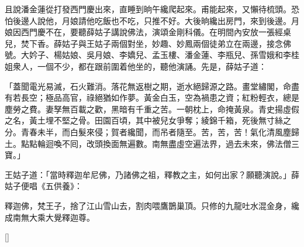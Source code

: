 且說潘金蓮從打發西門慶出來，直睡到晌午纔爬起來。甫能起來，又懶待梳頭。恐怕後邊人說他，月娘請他吃飯也不吃，只推不好。大後晌纔出房門，{}來到後邊。月娘因西門慶不在，要聽薛姑子講說佛法，演頌金剛科儀。在明間內安放一張經桌兒，焚下香。薛姑子與王姑子兩個對坐，妙趣、妙鳳兩個徒弟立在兩邊，接念佛號。大妗子、楊姑娘、吳月娘、李嬌兒、孟玉樓、潘金蓮、李瓶兒、孫雪娥和李桂姐衆人，一個不少，都在跟前圍着他坐的，聽他演誦。先是，薛姑子道：

\begin{myquote}[\markfont]
「蓋聞電光易滅，石火難消。落花無返樹之期，逝水絕歸源之路。畫堂繡閣，命盡有若長空；極品高官，祿絕猶如作夢。黃金白玉，空為禍患之資；紅粉輕衣，總是塵勞之費。妻孥無百載之歡，黑暗有千重之苦。一朝枕上，命掩黃泉。青史揚虛假之名，黃土埋不堅之骨。田園百頃，其中被兒女爭奪；綾錦千箱，死後無寸絲之分。青春未半，而白髮來侵；賀者纔聞，而吊者隨至。{}苦，苦，苦！氣化清風塵歸土。點點輪迴喚不囘，改頭換面無遍數。南無盡虛空遍法界，過去未來，佛法僧三寶。」

\end{myquote}

王姑子道：「當時釋迦牟尼佛，乃諸佛之祖，釋教之主，如何出家？願聽演說。」薛姑子便唱《五供養》：

\begin{myquote}[\markfont]
釋迦佛，梵王子，捨了江山雪山去，割肉喂鷹鵲巢頂。只修的九龍吐水混金身，纔成南無大乘大覺釋迦尊。
\end{myquote}[\markfont]

